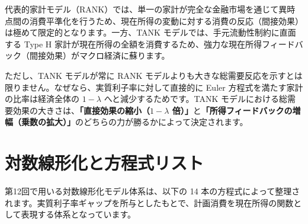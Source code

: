 \documentclass[
  japanese,
  lualatex,
  ja=standard,
  12pt,
  a4paper]{ltjsarticle}
\begin{document}
代表的家計モデル（RANK）では、単一の家計が完全な金融市場を通じて異時点間の消費平準化を行うため、現在所得の変動に対する消費の反応（間接効果）は極めて限定的となります。一方、TANK
モデルでは、手元流動性制約に直面する Type H
家計が現在所得の全額を消費するため、強力な現在所得フィードバック（間接効果）がマクロ経済に蘇ります。

ただし、TANK モデルが常に RANK
モデルよりも大きな総需要反応を示すとは限りません。なぜなら、実質利子率に対して直接的に
Euler 方程式を満たす家計の比率は経済全体の \(1-\lambda\)
へと減少するためです。TANK
モデルにおける総需要効果の大きさは、\textbf{「直接効果の縮小（\(1-\lambda\)
倍）」}と\textbf{「所得フィードバックの増幅（乗数の拡大）」}のどちらの力が勝るかによって決定されます。


\section{対数線形化と方程式リスト}\label{ux5bfeux6570ux7ddaux5f62ux5316ux3068ux65b9ux7a0bux5f0fux30eaux30b9ux30c8}

第12回で用いる対数線形化モデル体系は、以下の 14
本の方程式によって整理されます。実質利子率ギャップを所与としたもとで、計画消費を現在所得の関数として表現する体系となっています。
\end{document}
